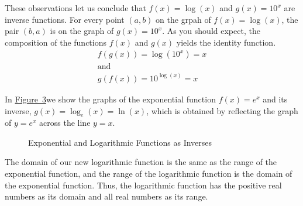 \documentclass[10pt,]{book}
\theoremstyle{plain}
\theoremstyle{definition}
\theoremstyle{definition}
\theoremstyle{definition}
\numberwithin{equation}{section}
\begin{document}
\par
\hypertarget{p-326}{}%
These observations let us conclude that \(f(x) = \log \left( x \right)\) and \(g(x) = 10^x\) are inverse functions. For every point \(\left( a, b \right)\) on the grpah of \(f(x) = \log \left( x\right)\), the pair \(\left( b, a \right)\) is on the graph of \(g(x) = 10^x\). As you should expect, the composition of the functions \(f(x)\) and \(g(x)\) yields the identity function.%
\begin{gather*}
f \left( g(x) \right) = \log \left( 10^x \right) = x\\
\text{and}\\
g \left( f(x) \right) = 10^{\log(x)} = x
\end{gather*}
%
\par
\hypertarget{p-327}{}%
In \hyperref[exponential-log-inverses]{Figure~3}we show the graphs of the exponential function \(f(x) = e^x\) and its inverse, \(g(x) = \log_{e} \left( x \right) = \ln \left( x \right)\), which is obtained by reflecting the graph of \(y = e^x\) across the line \(y = x\).%
\begin{figure}
\centering
{
}
\caption{Exponential and Logarithmic Functions as Inverses\label{exponential-log-inverses}}
\end{figure}
\hypertarget{p-328}{}%
The domain of our new logarithmic function is the same as the range of the exponential function, and the range of the logarithmic function is the domain of the exponential function. Thus, the logarithmic function has the positive real numbers as its domain and all real numbers as its range.%
\end{document}
